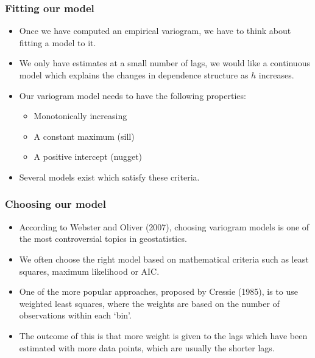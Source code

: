 \documentclass[parskip,12pt]{beamer}
\begin{document}
\begin{frame}
\begin{columns}
\begin{column}{0.53\textwidth}
\begin{center}
          \end{center}
\end{column}
\end{columns}
\end{frame}


\begin{frame}
\frametitle{Fitting our model}
 \begin{itemize}
\item Once we have computed an empirical variogram, we have to think about fitting a model to it.\vspace{3mm}
\item We only have estimates at a small number of lags, we would like a continuous model which explains the changes in dependence structure as $h$ increases.
\vspace{3mm}
\item Our variogram model needs to have the following properties:
\begin{itemize}
\item Monotonically increasing
\item A constant maximum (sill)
\item A positive intercept (nugget)
\end{itemize}
\vspace{3mm}
\item Several models exist which satisfy these criteria.
\end{itemize}
\end{frame}

\begin{frame}
\frametitle{Choosing our model}
 \begin{itemize}
\item According to Webster and Oliver (2007), choosing variogram models is one of the most controversial topics in geostatistics.
\vspace{3mm}
\item We often choose the right model based on mathematical criteria such as least squares, maximum likelihood or AIC.
\vspace{3mm}
\item One of the more popular approaches, proposed by Cressie (1985), is to use weighted least squares, where the weights are based on the number of observations within each `bin'.
\vspace{3mm}
\item The outcome of this is that more weight is given to the lags which have been estimated with more data points, which are usually the shorter lags.
\end{itemize}
\end{frame}
\end{document}
